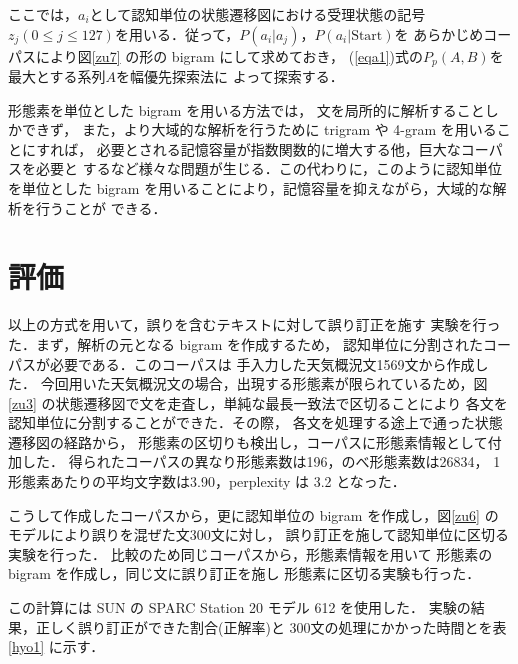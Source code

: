 ここでは，$a_i$として認知単位の状態遷移図における受理状態の記号
$z_j(0 \le j \le 127)$を用いる．従って，$P(a_i|a_j)$，$P(a_i|\mbox{Start})$を
あらかじめコーパスにより図\ref{zu7} の形の bigram にして求めておき，
(\ref{eqa1})式の$P_p(A, B)$を最大とする系列$A$を幅優先探索法に
よって探索する．

形態素を単位とした bigram を用いる方法では，
文を局所的に解析することしかできず，
また，より大域的な解析を行うために trigram や 4-gram を用いることにすれば，
必要とされる記憶容量が指数関数的に増大する他，巨大なコーパスを必要と
するなど様々な問題が生じる．この代わりに，このように認知単位を単位とした
bigram を用いることにより，記憶容量を抑えながら，大域的な解析を行うことが
できる．

\section{評価}

以上の方式を用いて，誤りを含むテキストに対して誤り訂正を施す
実験を行った．まず，解析の元となる bigram を作成するため，
認知単位に分割されたコーパスが必要である．このコーパスは
手入力した天気概況文1569文から作成した．
今回用いた天気概況文の場合，出現する形態素が限られているため，図\ref{zu3}
の状態遷移図で文を走査し，単純な最長一致法で区切ることにより
各文を認知単位に分割することができた．その際，
各文を処理する途上で通った状態遷移図の経路から，
形態素の区切りも検出し，コーパスに形態素情報として付加した．
得られたコーパスの異なり形態素数は196，のべ形態素数は26834，
1形態素あたりの平均文字数は3.90，perplexity は 3.2 となった．

こうして作成したコーパスから，更に認知単位の bigram 
を作成し，図\ref{zu6} のモデルにより誤りを混ぜた文300文に対し，
誤り訂正を施して認知単位に区切る実験を行った．
比較のため同じコーパスから，形態素情報を用いて
形態素の bigram を作成し，同じ文に誤り訂正を施し
形態素に区切る実験も行った．


この計算には SUN の SPARC Station 20 モデル 612 を使用した．
実験の結果，正しく誤り訂正ができた割合(正解率)と
300文の処理にかかった時間とを表\ref{hyo1} に示す．

